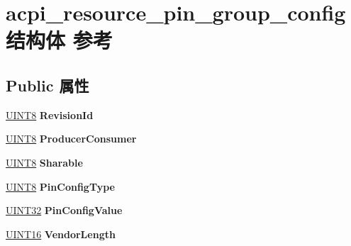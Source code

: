 \hypertarget{structacpi__resource__pin__group__config}{}\section{acpi\+\_\+resource\+\_\+pin\+\_\+group\+\_\+config结构体 参考}
\label{structacpi__resource__pin__group__config}
\subsection*{Public 属性}
\begin{DoxyCompactItemize}
\item 
\mbox{\label{structacpi__resource__pin__group__config_a380e3976508b7a3f1286f227c75a8d8a}} 
\hyperlink{_processor_bind_8h_ab27e9918b538ce9d8ca692479b375b6a}{U\+I\+N\+T8} {\bfseries Revision\+Id}
\item 
\mbox{\label{structacpi__resource__pin__group__config_acf61ffc9c81105bfb71fa11cf3f13857}} 
\hyperlink{_processor_bind_8h_ab27e9918b538ce9d8ca692479b375b6a}{U\+I\+N\+T8} {\bfseries Producer\+Consumer}
\item 
\mbox{\label{structacpi__resource__pin__group__config_a70b8baa7d397d3365b10b9906372911d}} 
\hyperlink{_processor_bind_8h_ab27e9918b538ce9d8ca692479b375b6a}{U\+I\+N\+T8} {\bfseries Sharable}
\item 
\mbox{\label{structacpi__resource__pin__group__config_a0b487dfc3cda9fc4eb88b465e439ff60}} 
\hyperlink{_processor_bind_8h_ab27e9918b538ce9d8ca692479b375b6a}{U\+I\+N\+T8} {\bfseries Pin\+Config\+Type}
\item 
\mbox{\label{structacpi__resource__pin__group__config_a6b0118bc88a7fbf0e5c03a4e403e6bc4}} 
\hyperlink{_processor_bind_8h_ae1e6edbbc26d6fbc71a90190d0266018}{U\+I\+N\+T32} {\bfseries Pin\+Config\+Value}
\item 
\mbox{\label{structacpi__resource__pin__group__config_a667af4677c027e605d039c15440ef32d}} 
\hyperlink{_processor_bind_8h_a09f1a1fb2293e33483cc8d44aefb1eb1}{U\+I\+N\+T16} {\bfseries Vendor\+Length}

\end{DoxyCompactItemize}
